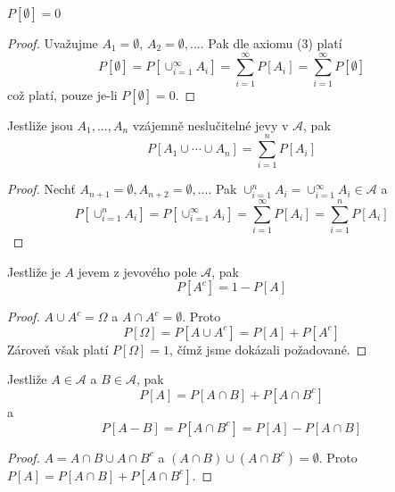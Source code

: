 \begin{theorem}
$P[\emptyset] = 0$
\end{theorem}
\begin{proof}
Uvažujme $A_1 = \emptyset$, $A_2 = \emptyset, ...$. Pak dle axiomu (3) platí
\begin{equation*}
P[\emptyset] = P[\cup_{i=1}^{\infty}A_i] = \sum_{i=1}^{\infty}P[A_i] = \sum_{i = 1}^{\infty}P[\emptyset]
\end{equation*}
což platí, pouze je-li $P[\emptyset] = 0$.
\end{proof}
\begin{theorem}
Jestliže jsou $A_1, ..., A_n$ vzájemně neslučitelné jevy v $\mathscr{A}$, pak
\begin{equation*}
P[A_1 \cup \cdots \cup A_n] = \sum_{i=1}^n P[A_i]
\end{equation*}
\end{theorem}
\begin{proof}
Nechť $A_{n+1} = \emptyset, A_{n+2} = \emptyset, ...$. Pak $\cup_{i = 1}^nA_i = \cup_{i = 1}^{\infty}A_i \in \mathscr{A}$ a
\begin{equation*}
P[\cup_{i=1}^n A_i] = P[\cup_{i=1}^{\infty}A_i] = \sum_{i=1}^{\infty}P[A_i] = \sum_{i=1}^nP[A_i]
\end{equation*}
\end{proof}
\begin{theorem}
Jestliže je $A$ jevem z jevového pole $\mathscr{A}$, pak
\begin{equation*}
P[A^c] = 1 - P[A]
\end{equation*}
\end{theorem}
\begin{proof}
$A \cup A^c = \Omega$ a $A \cap A^c = \emptyset$. Proto
\begin{equation*}
P[\Omega] = P[A \cup A^c] = P[A] + P[A^c]
\end{equation*}
Zároveň však platí $P[\Omega] = 1$, čímž jsme dokázali požadované.
\end{proof}
\begin{theorem}
Jestliže $A \in \mathscr{A}$ a $B \in \mathscr{A}$, pak
\begin{equation*}
P[A] = P[A \cap B] + P[A \cap B^c]
\end{equation*}
a
\begin{equation*}
P[A-B] = P[A \cap B^c] = P[A] - P[A \cap B]
\end{equation*}
\end{theorem}
\begin{proof}
$A = A \cap B \cup A \cap B^c$ a $(A \cap B) \cup (A \cap B^c) = \emptyset$. Proto $P[A] = P[A \cap B] + P[A \cap B^c]$.
\end{proof}
